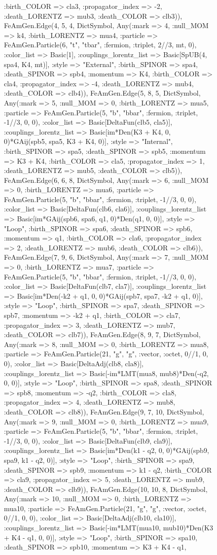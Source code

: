 \documentclass{revtex4}
\begin{document}
\begin{figure}[!htb]
\begin{center}
{:birth_COLOR => cla3, :propagator_index => -2, :death_LORENTZ => mub3, :death_COLOR => clb3)), FeAmGen.Edge(4, 5, 4, Dict{Symbol, Any}(:mark => 4, :null_MOM => k4, :birth_LORENTZ => mua4, :particle => FeAmGen.Particle(6, "t", "tbar", :fermion, :triplet, 2//3, mt, 0), :color_list => Basic[1], :couplings_lorentz_list => Basic[SpUB(4, spa4, K4, mt)], :style => "External", :birth_SPINOR => spa4, :death_SPINOR => spb4, :momentum => K4, :birth_COLOR => cla4, :propagator_index => -4, :death_LORENTZ => mub4, :death_COLOR => clb4)), FeAmGen.Edge(5, 8, 5, Dict{Symbol, Any}(:mark => 5, :null_MOM => 0, :birth_LORENTZ => mua5, :particle => FeAmGen.Particle(5, "b", "bbar", :fermion, :triplet, -1//3, 0, 0), :color_list => Basic[DeltaFun(clb5, cla5)], :couplings_lorentz_list => Basic[im*Den(K3 + K4, 0, 0)*GAij(spb5, spa5, K3 + K4, 0)], :style => "Internal", :birth_SPINOR => spa5, :death_SPINOR => spb5, :momentum => K3 + K4, :birth_COLOR => cla5, :propagator_index => 1, :death_LORENTZ => mub5, :death_COLOR => clb5)), FeAmGen.Edge(6, 6, 8, Dict{Symbol, Any}(:mark => 6, :null_MOM => 0, :birth_LORENTZ => mua6, :particle => FeAmGen.Particle(5, "b", "bbar", :fermion, :triplet, -1//3, 0, 0), :color_list => Basic[DeltaFun(clb6, cla6)], :couplings_lorentz_list => Basic[im*GAij(spb6, spa6, q1, 0)*Den(q1, 0, 0)], :style => "Loop", :birth_SPINOR => spa6, :death_SPINOR => spb6, :momentum => q1, :birth_COLOR => cla6, :propagator_index => 2, :death_LORENTZ => mub6, :death_COLOR => clb6)), FeAmGen.Edge(7, 9, 6, Dict{Symbol, Any}(:mark => 7, :null_MOM => 0, :birth_LORENTZ => mua7, :particle => FeAmGen.Particle(5, "b", "bbar", :fermion, :triplet, -1//3, 0, 0), :color_list => Basic[DeltaFun(clb7, cla7)], :couplings_lorentz_list => Basic[im*Den(-k2 + q1, 0, 0)*GAij(spb7, spa7, -k2 + q1, 0)], :style => "Loop", :birth_SPINOR => spa7, :death_SPINOR => spb7, :momentum => -k2 + q1, :birth_COLOR => cla7, :propagator_index => 3, :death_LORENTZ => mub7, :death_COLOR => clb7)), FeAmGen.Edge(8, 9, 7, Dict{Symbol, Any}(:mark => 8, :null_MOM => 0, :birth_LORENTZ => mua8, :particle => FeAmGen.Particle(21, "g", "g", :vector, :octet, 0//1, 0, 0), :color_list => Basic[DeltaAdj(clb8, cla8)], :couplings_lorentz_list => Basic[-im*LMT(mua8, mub8)*Den(-q2, 0, 0)], :style => "Loop", :birth_SPINOR => spa8, :death_SPINOR => spb8, :momentum => -q2, :birth_COLOR => cla8, :propagator_index => 4, :death_LORENTZ => mub8, :death_COLOR => clb8)), FeAmGen.Edge(9, 7, 10, Dict{Symbol, Any}(:mark => 9, :null_MOM => 0, :birth_LORENTZ => mua9, :particle => FeAmGen.Particle(5, "b", "bbar", :fermion, :triplet, -1//3, 0, 0), :color_list => Basic[DeltaFun(clb9, cla9)], :couplings_lorentz_list => Basic[im*Den(k1 - q2, 0, 0)*GAij(spb9, spa9, k1 - q2, 0)], :style => "Loop", :birth_SPINOR => spa9, :death_SPINOR => spb9, :momentum => k1 - q2, :birth_COLOR => cla9, :propagator_index => 5, :death_LORENTZ => mub9, :death_COLOR => clb9)), FeAmGen.Edge(10, 10, 8, Dict{Symbol, Any}(:mark => 10, :null_MOM => 0, :birth_LORENTZ => mua10, :particle => FeAmGen.Particle(21, "g", "g", :vector, :octet, 0//1, 0, 0), :color_list => Basic[DeltaAdj(clb10, cla10)], :couplings_lorentz_list => Basic[-im*LMT(mua10, mub10)*Den(K3 + K4 - q1, 0, 0)], :style => "Loop", :birth_SPINOR => spa10, :death_SPINOR => spb10, :momentum => K3 + K4 - q1, }
\end{center}
\end{figure}
\end{document}

